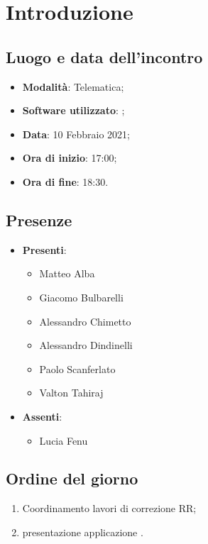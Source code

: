 \documentclass[]{article}
\begin{document}
	
	
	
	\newpage
	
	
		\section{Introduzione}
		\subsection{Luogo e data dell'incontro}
		\begin{itemize}
			\item \textbf{Modalità}: Telematica;
			\item \textbf{Software utilizzato}: ;
			\item \textbf{Data}: 10 Febbraio 2021;
			\item \textbf{Ora di inizio}: 17:00;
			\item \textbf{Ora di fine}: 18:30.
		\end{itemize}

		\subsection{Presenze}
		\begin{itemize}
			\item \textbf{Presenti}:
			\begin{itemize}
				\item Matteo Alba
				\item Giacomo Bulbarelli
				\item Alessandro Chimetto
				\item Alessandro Dindinelli
				\item Paolo Scanferlato
				\item Valton Tahiraj
			\end{itemize}
			\item \textbf{Assenti}:
			\begin{itemize}
				\item Lucia Fenu
			\end{itemize}
		\end{itemize}


		\subsection{Ordine del giorno}
		\begin{enumerate}
			\item Coordinamento lavori di correzione RR;
			\item presentazione applicazione .
		\end{enumerate}
\end{document}
